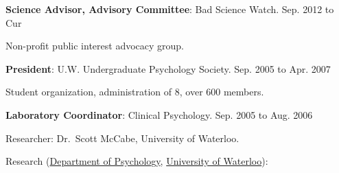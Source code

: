 \documentclass[10pt]{article}
\newenvironment{innerlist}[1][\enskip\textbullet]%
        {\begin{compactenum}[#1]}{\end{compactenum}}
\begin{document}
\begin{outerlist}
\itemsep1pt\parskip0pt
\item
  \textbf{Science Advisor, Advisory Committee}: Bad Science Watch.
  \hfill Sep. 2012 to Cur

 \begin{innerlist}
  \itemsep1pt\parskip0pt
  \item
    Non-profit public interest advocacy group.
 \end{innerlist}
\item
  \textbf{President}: U.W. Undergraduate Psychology Society. \hfill Sep.
  2005 to Apr. 2007

 \begin{innerlist}
  \itemsep1pt\parskip0pt
  \item
    Student organization, administration of 8, over 600 members.
 \end{innerlist}
\item
  \textbf{Laboratory Coordinator}: Clinical Psychology. \hfill Sep. 2005
  to Aug. 2006

 \begin{innerlist}
  \itemsep1pt\parskip0pt
  \item
    Researcher: Dr.~Scott McCabe, University of Waterloo.
 \end{innerlist}
\end{outerlist}

Research (\href{http://psychology.uwaterloo.ca}{Department of
Psychology}, \href{http://www.uwaterloo.ca/}{University of Waterloo}):
\end{document}
